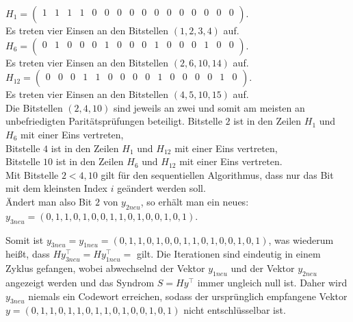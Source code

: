 \begin{Beispiel}
    $H_1= \left( \begin{array}{rrrrrrrrrrrrrrrr}
        1 & 1 & 1 & 1 & 0 & 0 & 0 & 0 & 0 & 0 & 0 & 0 & 0 & 0 & 0 & 0 \\
       \end{array}\right). 
    $\\
    Es treten vier Einsen an den Bitstellen $(1, 2, 3, 4)$ auf.\\
    
    $H_6= \left( \begin{array}{rrrrrrrrrrrrrrrr}
        0 & 1 & 0 & 0 & 0 & 1 & 0 & 0 & 0 & 1 & 0 & 0 & 0 & 1 & 0 & 0 \\
       \end{array}\right). 
    $\\
    Es treten vier Einsen an den Bitstellen $(2, 6, 10, 14)$ auf.\\
    
    $H_{12}= \left( \begin{array}{rrrrrrrrrrrrrrrr}
        0 & 0 & 0 & 1 & 1 & 0 & 0 & 0 & 0 & 1 & 0 & 0 & 0 & 0 & 1 & 0 \\
       \end{array}\right). 
    $\\
    Es treten vier Einsen an den Bitstellen $(4, 5, 10, 15)$ auf.\\
    
    Die Bitstellen $(2, 4, 10)$ sind jeweils an zwei und somit am meisten an unbefriedigten Paritätsprüfungen beteiligt.
    Bitstelle $2$ ist in den Zeilen $H_{1}$ und $H_{6}$ mit einer Eins vertreten,\\ 
    Bitstelle $4$ ist in den Zeilen $H_{1}$ und $H_{12}$ mit einer Eins vertreten,\\ 
    Bitstelle $10$ ist in den Zeilen $H_{6}$ und $H_{12}$ mit einer Eins vertreten.\\ 
    Mit Bitstelle $2 < 4, 10$ gilt für den sequentiellen Algorithmus, dass nur das Bit mit dem kleinsten Index $i$ geändert werden soll.\\
    
    Ändert man also Bit $2$ von $y_{2neu}$, so erhält man ein neues:\\
    $y_{3neu} = (0,1,1,0,1,0,0,1,1,0,1,0,0,1,0,1).$\\
    \pagebreak
    
    Somit ist $y_{3neu} = y_{1neu}= (0,1,1,0,1,0,0,1,1,0,1,0,0,1,0,1)$, was wiederum hei\ss{}t, dass $Hy_{3neu}^\intercal = Hy_{1neu}^\intercal =$ gilt. 
    Die Iterationen sind eindeutig in einem Zyklus gefangen, wobei abwechselnd
    der Vektor $y_{1neu}$ und der Vektor $y_{2neu}$ angezeigt werden und
    das Syndrom $S=Hy^\intercal$ immer ungleich null ist. 
    Daher wird $y_{3neu}$ niemals ein Codewort erreichen, 
    sodass der ursprünglich empfangene Vektor\\
    $y = (0,1,1,0,1,1,0,1,1,0,1,0,0,1,0,1)$ nicht entschlüsselbar ist.
    

\end{Beispiel}
